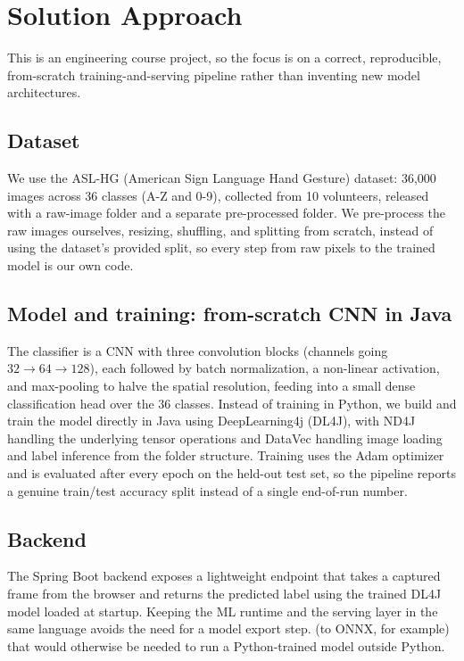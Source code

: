 \documentclass[12pt,a4paper]{article}
\begin{document}
\section{Solution Approach}

This is an engineering course project, so the focus is on a correct, reproducible,
from-scratch training-and-serving pipeline rather than inventing new model architectures.


\subsection{Dataset}

We use the ASL-HG (American Sign Language Hand Gesture) dataset: 36{,}000 images across 36
classes (A-Z and 0-9), collected from 10 volunteers, released with a raw-image folder and a
separate pre-processed folder. We pre-process the raw images ourselves, resizing, shuffling,
and splitting from scratch, instead of using the dataset's provided split, so every step from
raw pixels to the trained model is our own code.


\subsection{Model and training: from-scratch CNN in Java}

The classifier is a CNN with three convolution blocks (channels going $32 \to 64 \to 128$),
each followed by batch normalization, a non-linear activation, and max-pooling to halve the
spatial resolution, feeding into a small dense classification head over the 36 classes.
Instead of training in Python, we build and train the model directly in Java using
DeepLearning4j (DL4J), with ND4J handling the underlying tensor operations and DataVec
handling image loading and label inference from the folder structure. Training uses the Adam
optimizer and is evaluated after every epoch on the held-out test set, so the pipeline reports
a genuine train/test accuracy split instead of a single end-of-run number.


\subsection{Backend}

The Spring Boot backend exposes a lightweight endpoint that takes a captured frame from the
browser and returns the predicted label using the trained DL4J model loaded at startup.
Keeping the ML runtime and the serving layer in the same language avoids the need for a model export step.
(to ONNX, for example) that would otherwise be needed to run a Python-trained model outside
Python.
\end{document}
